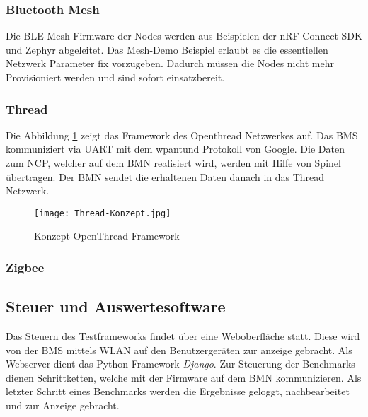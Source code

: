 \subsubsection{Bluetooth Mesh}\label{subsubsection:Bluetooth Mesh}

Die BLE-Mesh Firmware der Nodes werden aus Beispielen der nRF Connect SDK und Zephyr abgeleitet. Das Mesh-Demo Beispiel erlaubt es die essentiellen Netzwerk Parameter fix vorzugeben. Dadurch müssen die Nodes nicht mehr Provisioniert werden und sind sofort einsatzbereit.

\newpage
\subsubsection{Thread}\label{subsubsection:Thread} 
Die Abbildung \ref{fig:ThreadKonzept} zeigt das Framework des Openthread Netzwerkes auf. Das BMS kommuniziert via UART mit dem wpantund Protokoll von Google. Die Daten zum NCP, welcher auf dem BMN realisiert wird, werden mit Hilfe von Spinel übertragen. Der BMN sendet die erhaltenen Daten danach in das Thread Netzwerk.

\begin{figure}[H]
	\centering
	\texttt{[image: Thread-Konzept.jpg]}
	\caption{Konzept OpenThread Framework}\label{fig:ThreadKonzept}
\end{figure}



\subsubsection{Zigbee}\label{subsubsection:Zigbee}


\subsection{Steuer und Auswertesoftware}\label{subsec:SteuerundAuswertesoftware}

Das Steuern des Testframeworks findet über eine Weboberfläche statt. Diese wird von der BMS mittels WLAN auf den Benutzergeräten zur anzeige gebracht. Als Webserver dient das Python-Framework \textit{Django}. Zur Steuerung der Benchmarks dienen Schrittketten, welche mit der Firmware auf dem BMN kommunizieren. Als letzter Schritt eines Benchmarks werden die Ergebnisse geloggt, nachbearbeitet und zur Anzeige gebracht.

